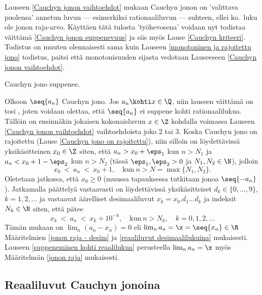 Lauseen \ref{Cauchyn jonon vaihtoehdot} mukaan Cauchyn jonon on 'valittava puolensa' annetun
luvun --- esimerkiksi rationaaliluvun --- suhteen, ellei ko.\ luku ole jonon raja-arvo.
Käyttäen tätä tulosta 'työhevosena' voidaan nyt todistaa väittämä
\eqref{Cauchyn jonon suppenevuus} ja siis myös Lause \ref{Cauchyn kriteeri}. Todistus on
muuten olennaisesti sama kuin Lauseen \ref{monotoninen ja rajoitettu jono} todistus, paitsi
että monotonisuuden sijasta vedotaan Lauseeseen \ref{Cauchyn jonon vaihtoehdot}. 
\begin{*Lause} \label{Cauchyn jono suppenee} Cauchyn jono suppenee. \end{*Lause}
\tod Olkoon $\seq{a_n}$ Cauchyn jono. Jos $a_n \kohti x\in\Q$, niin lauseen väittämä on tosi
, joten voidaan olettaa, että $\seq{a_n}$ ei suppene kohti rationaalilukua. Tällöin on
ensinnäkin jokaisen kokonaisluvun $x \in \Z$ kohdalla voimassa Lauseen
\ref{Cauchyn jonon vaihtoehdot} vaihtoehdoista joko 2 tai 3. Koska Cauchyn jono on rajoitettu
(Lause \ref{Cauchyn jono on rajoitettu}), niin silloin on löydettävissä yksikäsitteinen
$x_0 \in \Z$ siten, että $a_n > x_0 + \eps_1$ kun $n > N_1$ ja $a_n < x_0 + 1 - \eps_2$ kun
$n > N_2$ (tässä $\eps_1,\eps_2 > 0$ ja $N_1,N_2 \in \N$), jolloin 
\[
x_0\ <\ a_n\ <\ x_0 + 1, \quad \text{kun}\ n>N = \max \{N_1,N_2\}.
\]
Oletetaan jatkossa, että $x_0 \ge 0$ (muussa tapauksessa tutkitaan jonoa $\seq{-a_n}$).
Jatkamalla päättelyä vastaavasti on löydettävissä yksikäsitteiset
$d_k \in \{0,\ldots,9\}$, $ k = 1,2,\ldots$ ja vastaavat äärelliset desimaaliluvut 
$x_k = x_0.d_1 \ldots d_k$ ja indeksit $N_k \in \N$ siten, että pätee
\[
x_k\ <\ a_n\ <\ x_k + 10^{-k}, \quad \text{kun}\ n>N_k, \quad k=0,1,2,\ldots
\]
Tämän mukaan on $\lim_n (a_n-x_n)=0$ eli $\lim_n a_n =\x=\seq{x_n}\in\R$ Määritelmien
\ref{jonon raja - desim} ja \ref{reaaliluvut desimaalilukuina} mukaisesti. Lauseen
\ref{suppeneminen kohti reaalilukua} perusteella $\lim_na_n=\x$ myös Määritelmän
\ref{jonon raja} mukaisesti. \loppu

\subsection*{Reaaliluvut Cauchyn jonoina}

